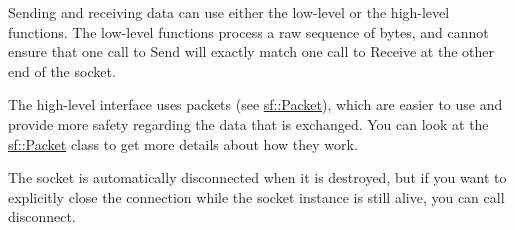Sending and receiving data can use either the low-\/level or the high-\/level functions. The low-\/level functions process a raw sequence of bytes, and cannot ensure that one call to Send will exactly match one call to Receive at the other end of the socket.

The high-\/level interface uses packets (see \mbox{\hyperlink{classsf_1_1_packet}{sf\+::\+Packet}}), which are easier to use and provide more safety regarding the data that is exchanged. You can look at the \mbox{\hyperlink{classsf_1_1_packet}{sf\+::\+Packet}} class to get more details about how they work.

The socket is automatically disconnected when it is destroyed, but if you want to explicitly close the connection while the socket instance is still alive, you can call disconnect.

